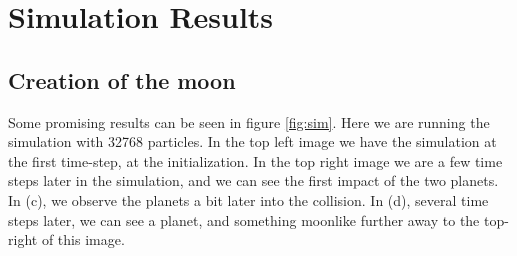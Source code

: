 \documentclass[a4paper]{article}
\begin{document}
\section{Simulation Results}

\subsection{Creation of the moon}

Some promising results can be seen in figure \ref{fig:sim}. Here we are running the simulation with 32768 particles. In the top left image we have the simulation at the first time-step, at the initialization. In the top right image we are a few time steps later in the simulation, and we can see the first impact of the two planets. In (c), we observe the planets a bit later into the collision. In (d), several time steps later, we can see a planet, and something moonlike further away to the top-right of this image.
\end{document}
